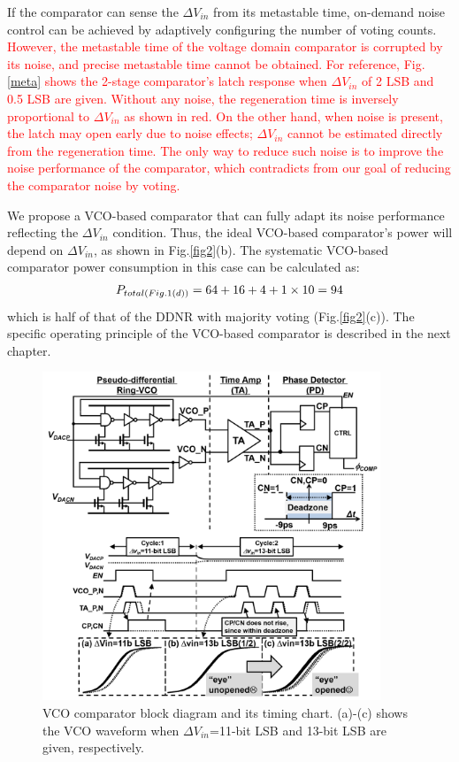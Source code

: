 \documentclass[journal]{IEEEtran}
\begin{document}
If the comparator can sense the $\Delta V_{in}$ from its metastable time, on-demand noise control can be achieved by adaptively configuring the number of voting counts.
\textcolor{red}{However, the metastable time of the voltage domain comparator is corrupted by its noise, and precise metastable time cannot be obtained. For reference, Fig.\ref{meta} shows the 2-stage comparator's latch response when $\Delta V_{in}$ of 2 LSB and 0.5 LSB are given. Without any noise, the regeneration time is inversely proportional to $\Delta V_{in}$ as shown in red. On the other hand, when noise is present, the latch may open early due to noise effects; $\Delta V_{in}$ cannot be estimated directly from the regeneration time. The only way to reduce such noise is to improve the noise performance of the comparator, which contradicts from our goal of reducing the comparator noise by voting.}

We propose a VCO-based comparator that can fully adapt its noise performance reflecting the $\Delta V_{in}$ condition. Thus, the ideal VCO-based comparator's power will depend on $\Delta V_{in}$, as shown in Fig.\ref{fig2}(b). The systematic VCO-based comparator power consumption in this case can be calculated as:
\begin{eqnarray}
    \centering
    P_{total(Fig.1(d))} = 64+16+4+1\times 10=94
    \label{ddnr}
\end{eqnarray}
which is half of that of the DDNR with majority voting (Fig.\ref{fig2}(c)). 
The specific operating principle of the VCO-based comparator is described in the next chapter.


\begin{figure}[!]
\centering
 \includegraphics[width=0.9\textwidth]{figs/fig4.png}
  \caption{VCO comparator block diagram and its timing chart. (a)-(c) shows the VCO waveform when $\Delta V_{in}$=11-bit LSB and 13-bit LSB are given, respectively.}
  \label{schema}
\end{figure}
\end{document}
